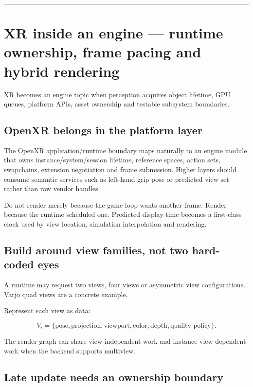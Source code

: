 \begin{center}\rule{0.5\linewidth}{0.5pt}\end{center}

\chapter{XR inside an engine --- runtime ownership, frame pacing and hybrid rendering}\label{06-engine-ii-ch042-xr-inside-an-engine-runtime-ownership-frame-pacing-and-hybrid-rendering}

XR becomes an engine topic when perception acquires object lifetime, GPU queues, platform APIs, asset ownership and testable subsystem boundaries.

\section{OpenXR belongs in the platform layer}\label{06-engine-ii-ch042-openxr-belongs-in-the-platform-layer}

The OpenXR application/runtime boundary maps naturally to an engine module that owns instance/system/session lifetime, reference spaces, action sets, swapchains, extension negotiation and frame submission. Higher layers should consume semantic services such as left-hand grip pose or predicted view set rather than raw vendor handles.

Do not render merely because the game loop wants another frame. Render because the runtime scheduled one. Predicted display time becomes a first-class clock used by view location, simulation interpolation and rendering.

\section{Build around view families, not two hard-coded eyes}\label{06-engine-ii-ch042-build-around-view-families-not-two-hard-coded-eyes}

A runtime may request two views, four views or asymmetric view configurations. Varjo quad views are a concrete example.

Represent each view as data:

\[
V_i=\{\text{pose},\text{projection},\text{viewport},
\text{color},\text{depth},\text{quality policy}\}.
\]

The render graph can share view-independent work and instance view-dependent work when the backend supports multiview.

\section{Late update needs an ownership boundary}\label{06-engine-ii-ch042-late-update-needs-an-ownership-boundary}

